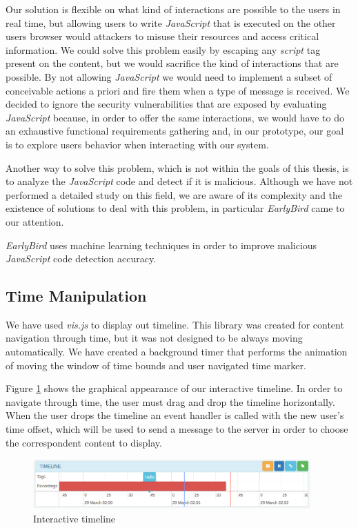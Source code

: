 	Our solution is flexible on what kind of interactions are possible to the users in real time, but allowing users to write \emph{JavaScript} that is executed on the other users browser would attackers to misuse their resources and access critical information. We could solve this problem easily by escaping any \emph{script} tag present on the content, but we would sacrifice the kind of interactions that are possible. By not allowing \emph{JavaScript} we would need to implement a subset of conceivable actions a priori and fire them when a type of message is received. We decided to ignore the security vulnerabilities that are exposed by evaluating \emph{JavaScript} because, in order to offer the same interactions, we would have to do an exhaustive functional requirements gathering and, in our prototype, our goal is to explore users behavior when interacting with our system. 

	Another way to solve this problem, which is not within the goals of this thesis, is to analyze the \emph{JavaScript} code and detect if it is malicious. Although we have not performed a detailed study on this field, we are aware of its complexity and the existence of solutions to deal with this problem, in particular \emph{EarlyBird}\cite{earlybird} came to our attention. 

\emph{EarlyBird} uses machine learning techniques in order to improve malicious \emph{JavaScript} code detection accuracy.


	\subsection{Time Manipulation}

	We have used \emph{vis.js} to display out timeline. This library was created for content navigation through time, but it was not designed to be always moving automatically. We have created a background timer that performs the animation of moving the window of time bounds and user navigated time marker.

	Figure \ref{fig:timeline} shows the graphical appearance of our interactive timeline. In order to navigate through time, the user must drag and drop the timeline horizontally. When the user drops the timeline an event handler is called with the new user's time offset, which will be used to send a message to the server in order to choose the correspondent content to display. 

	\begin{figure}
		\centering
		\includegraphics[width=0.95\textwidth]{figures/timeline.png}
		\caption{Interactive timeline}
		\label{fig:timeline}
	\end{figure}

